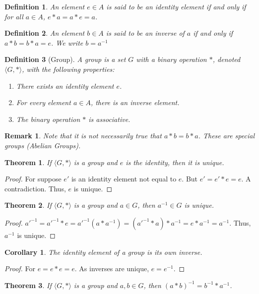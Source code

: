 \documentclass[crop=false,class=book]{standalone}
\theoremstyle{mystyle}
\newtheorem{theorem}{Theorem}[section]
\newtheorem{definition}{Definition}[section]
\newtheorem{corollary}{Corollary}[section]
\newtheorem{remark}{Remark}[section]
\begin{document}
\begin{definition}
An element $e\in A$ is said to be an identity element if and only if for all $a\in A$, $e*a = a*e = a$.
\end{definition}
\begin{definition}
An element $b\in A$ is said to be an inverse of $a$ if and only if $a*b=b*a = e$. We write $b=a^{-1}$
\end{definition}
\begin{definition}[Group]
A group is a set $G$ with a binary operation $*$, denoted $\langle G,* \rangle$, with the following properties: 
\begin{enumerate}
\item There exists an identity element $e$.
\item For every element $a\in A$, there is an inverse element.
\item The binary operation $*$ is associative.
\end{enumerate}
\end{definition}
\begin{remark}
Note that it is not necessarily true that $a*b = b*a$. These are special groups (Abelian Groups).
\end{remark}
\begin{theorem}
If $\langle G, * \rangle$ is a group and $e$ is the identity, then it is unique.
\end{theorem}
\begin{proof}
For suppose $e'$ is an identity element not equal to $e$. But $e' = e'*e  = e$. A contradiction. Thus, $e$ is unique.
\end{proof}
\begin{theorem}
If $\langle G, * \rangle$ is a group and $a\in G$, then $a^{-1}\in G$ is unique.
\end{theorem}
\begin{proof}
$a'^{-1} = a'^{-1}*e = a'^{-1}(a*a^{-1}) = (a'^{-1}*a)*a^{-1} = e*a^{-1} = a^{-1}$. Thus, $a^{-1}$ is unique.
\end{proof}
\begin{corollary}
The identity element of a group is its own inverse.
\end{corollary}
\begin{proof}
For $e=e*e = e$. As inverses are unique, $e=e^{-1}$.
\end{proof}
\begin{theorem}
If $\langle G,*\rangle$ is a group and $a,b\in G$, then $(a*b)^{-1} = b^{-1}*a^{-1}$.
\end{theorem}
\end{document}
